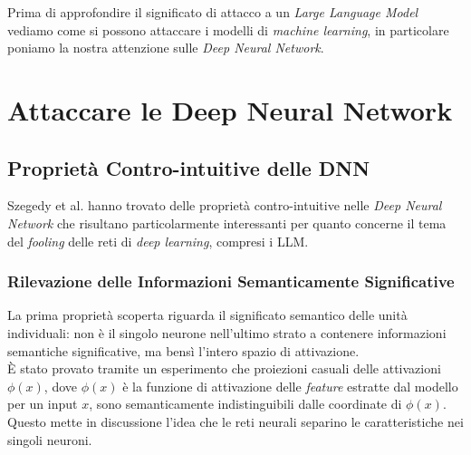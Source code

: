 
Prima di approfondire il significato di attacco a un \emph{Large Language Model} vediamo come si possono attaccare i modelli di \emph{machine learning}, in particolare poniamo la nostra attenzione sulle \emph{Deep Neural Network}.

\section{Attaccare le Deep Neural Network}
\subsection{Propriet\`a Contro-intuitive delle DNN}
Szegedy et al. \cite{intriguing13} hanno trovato delle propriet\`a contro-intuitive nelle \emph{Deep Neural Network} che risultano particolarmente interessanti per quanto concerne il tema del \emph{fooling} delle reti di \emph{deep learning}, compresi i LLM.

\subsubsection{Rilevazione delle Informazioni Semanticamente Significative}
La prima propriet\`a scoperta riguarda il significato semantico delle unit\`a individuali: non \`e il singolo neurone nell'ultimo strato a contenere informazioni semantiche significative, ma bens\`i l'intero spazio di attivazione.\\
\`E stato provato tramite un esperimento che proiezioni casuali delle attivazioni \(\phi(x)\), dove \(\phi(x)\) \`e la funzione di attivazione delle \emph{feature} estratte dal modello per un input \(x\), sono semanticamente indistinguibili dalle coordinate di \(\phi(x)\). Questo mette in discussione l'idea che le reti neurali separino le caratteristiche nei singoli neuroni.

